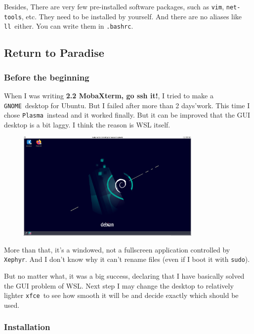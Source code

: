 \documentclass[12pt]{ctexart}
\begin{document}
\fontsize{12}{14}

Besides, There are very few pre-installed software packages, such as
\texttt{vim}, \texttt{net-tools}, etc. They need to be installed by
yourself. And there are no aliases like \texttt{ll}\ either. You can
write them in \texttt{.bashrc}.

\newpage
\subsection{\textbf{Return to Paradise}}

\subsubsection{\textbf{Before the beginning}}

When I was writing \textbf{2.2 MobaXterm, go ssh it!}, I tried to make a
\texttt{GNOME}\ desktop for Ubuntu. But I failed after more than 2
days'work. This time I chose \texttt{Plasma}\ instead
and it worked finally. But it can be improved that the GUI desktop is a
bit laggy. I think the reason is WSL itself.

\begin{figure}[H]
    \centering
    \includegraphics[width=0.8\textwidth,keepaspectratio]{assets/Linux/2.8 Return to Paradise/1.png}
\end{figure}

More than that, it's a windowed, not a fullscreen
application controlled by \texttt{Xephyr}. And I don't
know why it can't rename files (even if I boot it with
\texttt{sudo}).

But no matter what, it was a big success, declaring that I have
basically solved the GUI problem of WSL. Next step I may change the
desktop to relatively lighter \texttt{xfce}\ to see how smooth it will be
and decide exactly which should be used.

\subsubsection{\textbf{Installation}}
\end{document}
